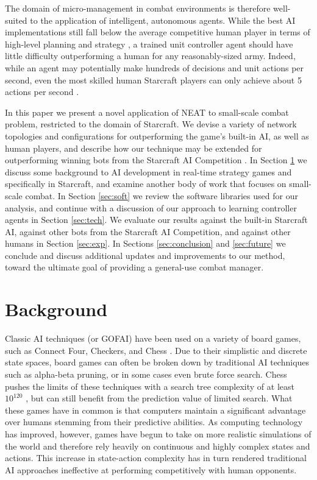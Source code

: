 \documentclass[10pt,a4paper,twocolumn]{article}
\begin{document}
The domain of micro-management in combat environments is therefore well-suited to the application of intelligent, autonomous agents. While the best AI implementations still fall below the average competitive human player in terms of high-level planning and strategy \cite{weber2011building}, a trained unit controller agent should have little difficulty outperforming a human for any reasonably-sized army. Indeed, while an agent may potentially make hundreds of decisions and unit actions per second, even the most skilled human Starcraft players can only achieve about 5 actions per second \cite{mccoy2008integrated}.

In this paper we present a novel application of NEAT to small-scale combat problem, restricted to the domain of Starcraft. We devise a variety of network topologies and configurations for outperforming the game's built-in AI, as well as human players, and describe how our technique may be extended for outperforming winning bots from the Starcraft AI Competition \cite{ai_competition}. In Section \ref{sec:back} we discuss some background to AI development in real-time strategy games and specifically in Starcraft, and examine another body of work that focuses on small-scale combat. In Section \ref{sec:soft} we review the software libraries used for our analysis, and continue with a discussion of our approach to learning controller agents in Section \ref{sec:tech}. We evaluate our results against the built-in Starcraft AI, against other bots from the Starcraft AI Competition, and against other humans in Section \ref{sec:exp}. In Sections \ref{sec:conclusion} and \ref{sec:future} we conclude and discuss additional updates and improvements to our method, toward the ultimate goal of providing a general-use combat manager.

\section{Background}
\label{sec:back}

Classic AI techniques (or GOFAI) have been used on a variety of board games, such as Connect Four, Checkers, and Chess \cite{Allis94searchingfor}. Due to their simplistic and discrete state spaces, board games can often be broken down by traditional AI techniques such as alpha-beta pruning, or in some cases even brute force search. Chess pushes the limits of these techniques with a search tree complexity of at least $10^{120}$ \cite{Shannon:1988:PCP:61701.67002}, but can still benefit from the prediction value of limited search. What these games have in common is that computers maintain a significant advantage over humans stemming from their predictive abilities. As computing technology has improved, however, games have begun to take on more realistic simulations of the world and therefore rely heavily on continuous and highly complex states and actions. This increase in state-action complexity has in turn rendered traditional AI approaches ineffective at performing competitively with human opponents.
\end{document}
